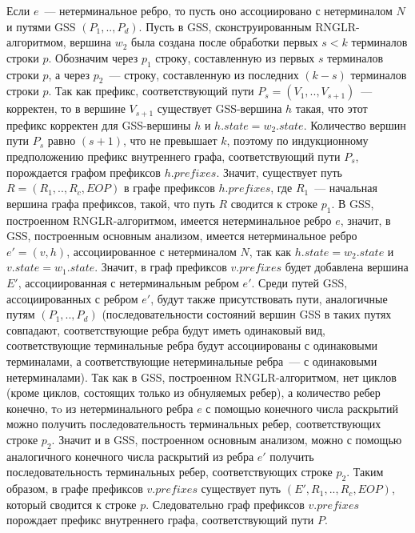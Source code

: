 Если $e$~--- нетерминальное ребро, то пусть оно ассоциировано с нетерминалом $N$ и путями GSS $(P_{1},..,P_{d})$. Пусть в GSS, сконструированным RNGLR-алгоритмом, вершина $w_{2}$ была создана после обработки первых $s < k$ терминалов строки $p$. Обозначим через $p_{1}$ строку, составленную из первых $s$ терминалов строки $p$, а через $p_{2}$~--- строку, составленную из последних $(k - s)$ терминалов строки $p$. Так как префикс, соответствующий пути $P_{s} = (V_{1},..,V_{s+1})$~--- корректен, то в вершине $V_{s+1}$ существует GSS-вершина $h$ такая, что этот префикс корректен для GSS-вершины $h$ и $h.state = w_{2}.state$. Количество вершин пути $P_{s}$ равно $(s + 1)$, что не превышает $k$, поэтому по индукционному предположению префикс внутреннего графа, соответствующий пути $P_{s}$, порождается графом префиксов $h.prefixes$.  Значит, существует путь $R = (R_{1},..,R_{c},EOP)$ в графе префиксов $h.prefixes$, где $R_{1}$~--- начальная вершина графа префиксов, такой, что путь $R$ сводится к строке $p_{1}$. В GSS, построенном RNGLR-алгоритмом, имеется нетерминальное ребро $e$, значит, в GSS, построенным основным анализом, имеется нетерминальное ребро $e' = (v, h)$, ассоциированное с нетерминалом $N$, так как $h.state = w_{2}.state$ и $v.state = w_{1}.state$. Значит, в граф префиксов $v.prefixes$ будет добавлена вершина $E'$, ассоциированная с нетерминальным ребром $e'$. Среди путей GSS, ассоциированных с ребром $e'$, будут также присутствовать пути, аналогичные путям $(P_{1},..,P_{d})$ (последовательности состояний вершин GSS в таких путях совпадают, соответствующие ребра будут иметь одинаковый вид, соответствующие терминальные ребра будут ассоциированы с одинаковыми терминалами, а соответствующие нетерминальные ребра~--- с одинаковыми нетерминалами). Так как в GSS, построенном RNGLR-алгоритмом, нет циклов (кроме циклов, состоящих только из обнуляемых ребер), а количество ребер конечно, тo из нетерминального ребра $e$ с помощью конечного числа раскрытий можно получить последовательность терминальных ребер, соответствующих строке $p_{2}$. Значит и в GSS, построенном основным анализом, можно с помощью аналогичного конечного числа раскрытий из ребра $e'$ получить последовательность терминальных ребер, соответствующих строке $p_{2}$. Таким образом, в графе префиксов $v.prefixes$ существует путь $(E',R_{1},..,R_{c},EOP)$, который сводится к строке $p$. Следовательно граф префиксов $v.prefixes$ порождает префикс внутреннего графа, соответствующий пути $P$.
% 

